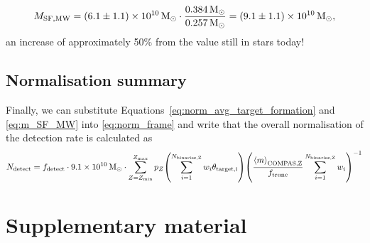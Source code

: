 \begin{equation}
    M_{\rm SF, MW} = (6.1 \pm 1.1) \times 10^{10} \unit{M_{\odot}} \cdot \frac{0.384 \unit{M_{\odot}}}{0.257 \unit{M_{\odot}}} = (9.1 \pm 1.1) \times 10^{10} \unit{M_{\odot}},
\end{equation}
an increase of approximately 50\% from the value still in stars today!

\subsection{Normalisation summary}
Finally, we can substitute Equations~\ref{eq:norm_avg_target_formation} and \ref{eq:m_SF_MW} into \ref{eq:norm_frame} and write that the overall normalisation of the detection rate is calculated as
\begin{equation}
    N_{\rm detect} = f_{\rm detect} \cdot 9.1 \times 10^{10} \unit{M_{\odot}} \cdot \sum_{Z=Z_{\rm min}}^{Z_{\rm max}} p_{Z} \qty(\sum_{i=1}^{N_{\rm binaries, Z}} w_i \theta_{\rm target, i}) \qty(\frac{\avg{m}_{\rm COMPAS, Z}}{f_{\rm trunc}} \sum_{i=1}^{N_{\rm binaries, Z}} w_i)^{-1}
\end{equation}

\section{Supplementary material}

